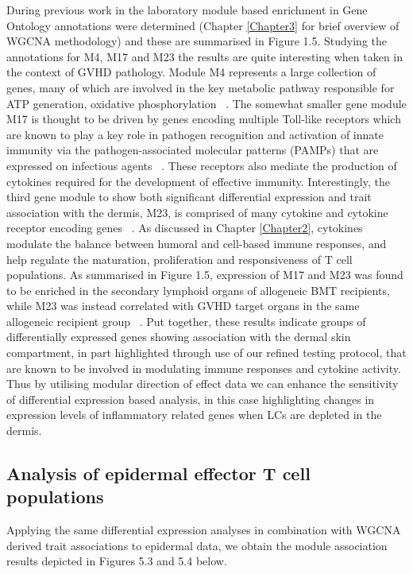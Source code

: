 During previous work in the laboratory module based enrichment in Gene Ontology annotations were determined (Chapter \ref{Chapter3} for brief overview of WGCNA methodology) and these are summarised in Figure 1.5. Studying the annotations for M4, M17 and M23 the results are quite interesting when taken in the context of GVHD pathology. Module M4 represents a large collection of genes, many of which are involved in the key metabolic pathway responsible for ATP generation, oxidative phosphorylation ~\autocite{Santos}. The somewhat smaller gene module M17 is thought to be driven by genes encoding multiple Toll-like receptors which are known to play a key role in pathogen recognition and activation of innate immunity via the pathogen-associated molecular patterns (PAMPs) that are expressed on infectious agents ~\autocite{Santos}. These receptors also mediate the production of cytokines required for the development of effective immunity. Interestingly, the third gene module to show both significant differential expression and trait association with the dermis, M23, is comprised of many cytokine and cytokine receptor encoding genes ~\autocite{Santos}. As discussed in Chapter \ref{Chapter2}, cytokines modulate the balance between humoral and cell-based immune responses, and help regulate the maturation, proliferation and responsiveness of T cell populations. As summarised in Figure 1.5, expression of M17 and M23 was found to be enriched in the secondary lymphoid organs of allogeneic BMT recipients, while M23 was instead correlated with GVHD target organs in the same allogeneic recipient group ~\autocite{Santos}. Put together, these results indicate groups of differentially expressed genes showing association with the dermal skin compartment, in part highlighted through use of our refined testing protocol, that are known to be involved in modulating immune responses and cytokine activity. Thus by utilising modular direction of effect data we can enhance the sensitivity of differential expression based analysis, in this case highlighting changes in expression levels of inflammatory related genes when LCs are depleted in the dermis. 

\subsection{Analysis of epidermal effector T cell populations} 

Applying the same differential expression analyses in combination with WGCNA derived trait associations to epidermal data, we obtain the module association results depicted in Figures 5.3 and 5.4 below. 

